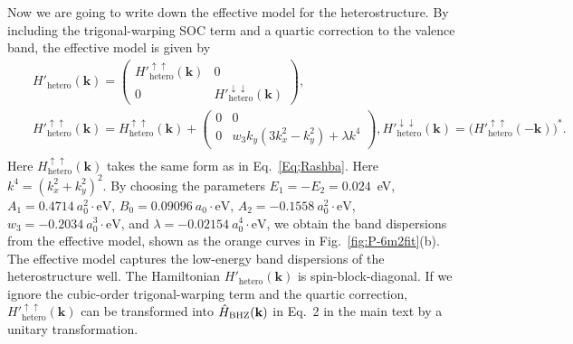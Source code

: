 \documentclass[aps, preprint, prb,]{revtex4-2}
\def\kk{\mathbf{k}}
\begin{document}
Now we are going to write down the effective model for the heterostructure. By including the trigonal-warping SOC term and a quartic correction to the valence band, the effective model is given by
\begin{eqnarray}
&&H'_{\mathrm{hetero}}(\kk)=
\begin{pmatrix}
H'^{\uparrow\uparrow}_{\mathrm{hetero}}(\kk) & 0 \\
0 & H'^{\downarrow\downarrow}_{\mathrm{hetero}}(\kk)
\end{pmatrix},\nonumber\\
&&H'^{\uparrow\uparrow}_{\mathrm{hetero}}(\kk)=H^{\uparrow\uparrow}_{\mathrm{hetero}}(\kk)+
\begin{pmatrix}
0 & 0 \nonumber \\
0 &w_3 k_y(3k_x^2-k_y^2)+\lambda k^4
\end{pmatrix}, H'^{\downarrow\downarrow}_{\mathrm{hetero}}(\kk)=
\bigl(H'^{\uparrow\uparrow}_{\mathrm{hetero}}(-\kk)\bigr)^*. \\
 \label{Eq;trigonal-warping}
\end{eqnarray}
Here $H^{\uparrow\uparrow}_{\mathrm{hetero}}(\kk)$ takes the same form as in Eq.~\ref{Eq;Rashba}. Here $k^4=(k_x^2+k_y^2)^2$. By choosing the parameters $E_1=-E_2=0.024$~eV, $A_1=0.4714~a_0^2\!\cdot\!\mathrm{eV}$, $B_0=0.09096~a_0\!\cdot\!\mathrm{eV}$, $A_2=-0.1558~a_0^2\!\cdot\!\mathrm{eV}$, $w_3=-0.2034~a_0^3\!\cdot\!\mathrm{eV}$, and $\lambda=-0.02154~a_0^4\!\cdot\!\mathrm{eV}$, we obtain the band dispersions from the effective model, shown as the orange curves in Fig.~\ref{fig:P-6m2fit}(b). The effective model captures the low-energy band dispersions of the heterostructure well. The Hamiltonian $H'_{\mathrm{hetero}}(\kk)$ is spin-block-diagonal. If we ignore the cubic-order trigonal-warping term and the quartic correction, $H'^{\uparrow\uparrow}_{\mathrm{hetero}}(\kk)$ can be transformed into $\hat{H}_{\rm BHZ}(\mathbf{k})$ in Eq.~2 in the main text by a unitary transformation.
\end{document}
